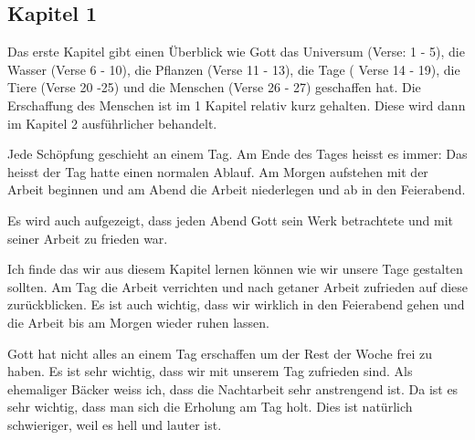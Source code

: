\subsection{Kapitel 1}
Das erste Kapitel gibt einen Überblick wie Gott das Universum (Verse: 1 - 5), die Wasser (Verse 6 - 10), die Pflanzen (Verse 11 - 13), die Tage ( Verse 14 - 19), die Tiere (Verse 20 -25) und die Menschen (Verse 26 - 27) geschaffen hat. Die Erschaffung des Menschen ist im 1 Kapitel relativ kurz gehalten. Diese wird dann im Kapitel 2 ausführlicher behandelt.

Jede Schöpfung geschieht an einem Tag. Am Ende des Tages heisst es immer:  Das heisst der Tag hatte einen normalen Ablauf. Am Morgen aufstehen mit der Arbeit beginnen und am Abend die Arbeit niederlegen und ab in den Feierabend.

Es wird auch aufgezeigt, dass jeden Abend Gott sein Werk betrachtete und mit seiner Arbeit zu frieden war.

Ich finde das wir aus diesem Kapitel lernen können wie wir unsere Tage gestalten sollten. Am Tag die Arbeit verrichten und nach getaner Arbeit zufrieden auf diese zurückblicken. Es ist auch wichtig, dass wir wirklich in den Feierabend gehen und die Arbeit bis am Morgen wieder ruhen lassen.

Gott hat nicht alles an einem Tag erschaffen um der Rest der Woche frei zu haben. Es ist sehr wichtig, dass wir mit unserem Tag zufrieden sind. Als ehemaliger Bäcker weiss ich, dass die Nachtarbeit sehr anstrengend ist. Da ist es sehr wichtig, dass man sich die Erholung am Tag holt. Dies ist natürlich schwieriger, weil es hell und lauter ist.